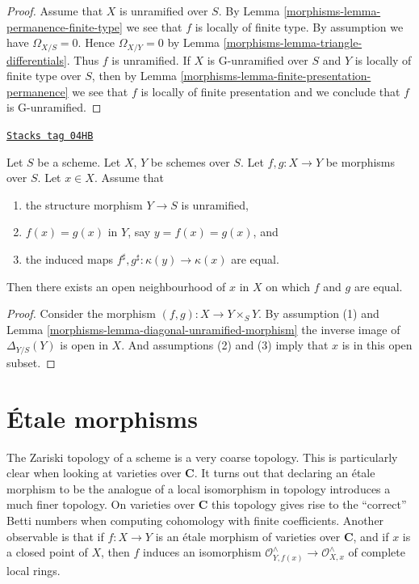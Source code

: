 \begin{proof}

Assume that $X$ is unramified over $S$.
By Lemma \ref{morphisms-lemma-permanence-finite-type} we see that $f$
is locally of finite type.
By assumption we have $\Omega_{X/S} = 0$. Hence
$\Omega_{X/Y} = 0$ by Lemma \ref{morphisms-lemma-triangle-differentials}. Thus
$f$ is unramified. If $X$ is G-unramified over $S$ and $Y$ is locally of
finite type over $S$, then by
Lemma \ref{morphisms-lemma-finite-presentation-permanence}
we see that $f$ is locally of finite presentation and we conclude
that $f$ is G-unramified.
\end{proof}

\begin{lemma}
\label{morphisms-lemma-value-at-one-point}
\href{https://stacks.math.columbia.edu/tag/04HB}{\texttt{Stacks tag 04HB}}

Let $S$ be a scheme.
Let $X$, $Y$ be schemes over $S$.
Let $f, g : X \to Y$ be morphisms over $S$. Let $x \in X$.
Assume that
\begin{enumerate}
\item the structure morphism $Y \to S$ is unramified,
\item $f(x) = g(x)$ in $Y$, say $y = f(x) = g(x)$, and
\item the induced maps $f^\sharp, g^\sharp : \kappa(y) \to \kappa(x)$
are equal.
\end{enumerate}
Then there exists an open neighbourhood of $x$ in $X$ on which
$f$ and $g$ are equal.
\end{lemma}

\begin{proof}

Consider the morphism $(f, g) : X \to Y \times_S Y$. By assumption (1) and
Lemma \ref{morphisms-lemma-diagonal-unramified-morphism}
the inverse image of $\Delta_{Y/S}(Y)$ is open in $X$.
And assumptions (2) and (3) imply that $x$ is in this open subset.
\end{proof}

\section{\'Etale morphisms}
\label{morphisms-section-etale}
The Zariski topology of a scheme is a very coarse topology.
This is particularly clear when looking at varieties over $\mathbf{C}$.
It turns out that declaring an \'etale morphism to be the analogue of a
local isomorphism in topology introduces a much finer topology. On
varieties over $\mathbf{C}$ this topology gives rise to the ``correct'' Betti
numbers when computing cohomology with finite coefficients. Another
observable is that if $f : X \to Y$ is an \'etale morphism of varieties over
$\mathbf{C}$, and if $x$ is a closed point of $X$, then
$f$ induces an isomorphism
$\mathcal{O}^{\wedge}_{Y, f(x)} \to \mathcal{O}^{\wedge}_{X, x}$
of complete local rings.

